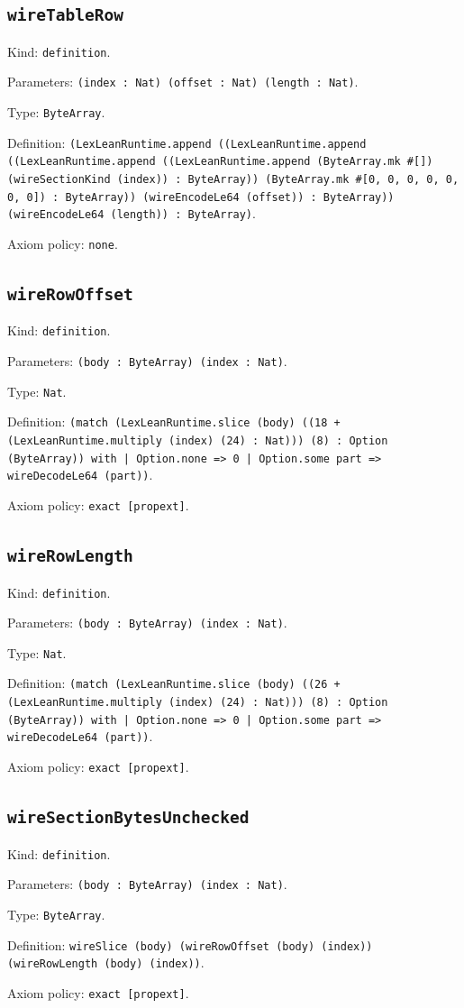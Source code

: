 \documentclass[11pt]{article}
\begin{document}
\subsection*{\texttt{wireTableRow}}
\noindent Kind: \texttt{definition}.\par
\noindent Parameters: \texttt{(index : Nat) (offset : Nat) (length : Nat)}.\par
\noindent Type: \texttt{ByteArray}.\par
\noindent Definition: \texttt{(LexLeanRuntime.append ((LexLeanRuntime.append ((LexLeanRuntime.append ((LexLeanRuntime.append (ByteArray.mk \#[]) (wireSectionKind (index)) : ByteArray)) (ByteArray.mk \#[0, 0, 0, 0, 0, 0, 0]) : ByteArray)) (wireEncodeLe64 (offset)) : ByteArray)) (wireEncodeLe64 (length)) : ByteArray)}.\par
\noindent Axiom policy: \texttt{none}.\par
\subsection*{\texttt{wireRowOffset}}
\noindent Kind: \texttt{definition}.\par
\noindent Parameters: \texttt{(body : ByteArray) (index : Nat)}.\par
\noindent Type: \texttt{Nat}.\par
\noindent Definition: \texttt{(match (LexLeanRuntime.slice (body) ((18 + (LexLeanRuntime.multiply (index) (24) : Nat))) (8) : Option (ByteArray)) with | Option.none => 0 | Option.some part => wireDecodeLe64 (part))}.\par
\noindent Axiom policy: \texttt{exact [propext]}.\par
\subsection*{\texttt{wireRowLength}}
\noindent Kind: \texttt{definition}.\par
\noindent Parameters: \texttt{(body : ByteArray) (index : Nat)}.\par
\noindent Type: \texttt{Nat}.\par
\noindent Definition: \texttt{(match (LexLeanRuntime.slice (body) ((26 + (LexLeanRuntime.multiply (index) (24) : Nat))) (8) : Option (ByteArray)) with | Option.none => 0 | Option.some part => wireDecodeLe64 (part))}.\par
\noindent Axiom policy: \texttt{exact [propext]}.\par
\subsection*{\texttt{wireSectionBytesUnchecked}}
\noindent Kind: \texttt{definition}.\par
\noindent Parameters: \texttt{(body : ByteArray) (index : Nat)}.\par
\noindent Type: \texttt{ByteArray}.\par
\noindent Definition: \texttt{wireSlice (body) (wireRowOffset (body) (index)) (wireRowLength (body) (index))}.\par
\noindent Axiom policy: \texttt{exact [propext]}.\par
\end{document}
